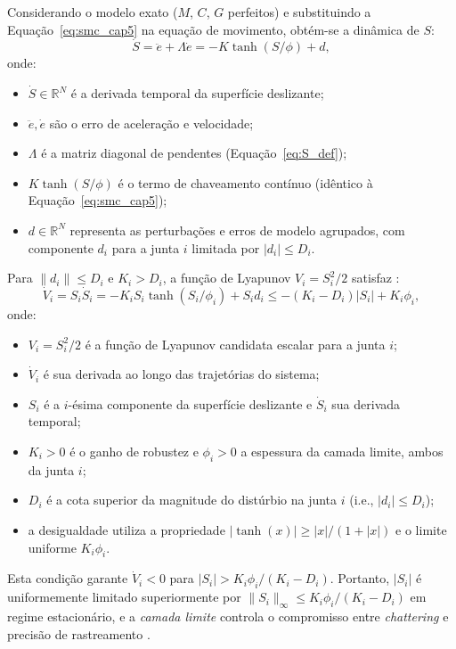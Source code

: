 Considerando o modelo exato ($M$, $C$, $G$ perfeitos) e substituindo a Equação~\eqref{eq:smc_cap5} na equação de movimento, obtém-se a dinâmica de $S$:
\begin{equation}
    \dot{S} = \ddot{e} + \Lambda\dot{e} = -K\tanh(S/\phi) + d,
    \label{eq:S_dot}
\end{equation}
onde:
\begin{itemize}
    \item $\dot{S} \in \mathbb{R}^N$ é a derivada temporal da superfície deslizante;
    \item $\ddot{e}, \dot{e}$ são o erro de aceleração e velocidade;
    \item $\Lambda$ é a matriz diagonal de pendentes (Equação~\eqref{eq:S_def});
    \item $K\tanh(S/\phi)$ é o termo de chaveamento contínuo (idêntico à Equação~\eqref{eq:smc_cap5});
    \item $d \in \mathbb{R}^N$ representa as perturbações e erros de modelo agrupados, com componente $d_i$ para a junta $i$ limitada por $|d_i| \leq D_i$.
\end{itemize}

Para $\|d_i\| \leq D_i$ e $K_i > D_i$, a função de Lyapunov $V_i = S_i^2/2$ satisfaz \cite{slotine1991applied, edwards1998sliding}:
\begin{equation}
    \dot{V}_i = S_i\dot{S}_i = -K_i S_i \tanh(S_i/\phi_i) + S_i d_i \leq -\left(K_i - D_i\right)|S_i| + K_i \phi_i,
    \label{eq:lyap_smc}
\end{equation}
onde:
\begin{itemize}
    \item $V_i = S_i^2/2$ é a função de Lyapunov candidata escalar para a junta $i$;
    \item $\dot{V}_i$ é sua derivada ao longo das trajetórias do sistema;
    \item $S_i$ é a $i$-ésima componente da superfície deslizante e $\dot{S}_i$ sua derivada temporal;
    \item $K_i > 0$ é o ganho de robustez e $\phi_i > 0$ a espessura da camada limite, ambos da junta $i$;
    \item $D_i$ é a cota superior da magnitude do distúrbio na junta $i$ (i.e., $|d_i| \leq D_i$);
    \item a desigualdade utiliza a propriedade $|\tanh(x)| \geq |x|/(1+|x|)$ e o limite uniforme $K_i\phi_i$.
\end{itemize}
Esta condição garante $\dot{V}_i < 0$ para $|S_i| > K_i\phi_i / (K_i - D_i)$. Portanto, $|S_i|$ é uniformemente limitado superiormente por $\|S_i\|_\infty \leq K_i\phi_i/(K_i - D_i)$ em regime estacionário, e a \textit{camada limite} controla o compromisso entre \textit{chattering} e precisão de rastreamento \cite{burton1986continuous}.

